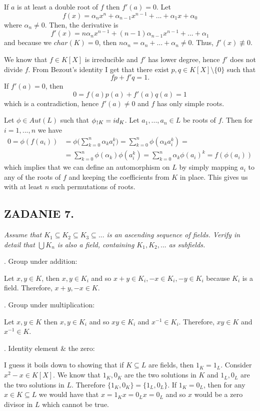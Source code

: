 \documentclass{article}
\begin{document}
If $a$ is at least a double root of $f$ then $f'(a)=0$. Let
$$f(x)=\alpha_nx^n+\alpha_{n-1}x^{n-1}+...+\alpha_1x+\alpha_0$$
where $\alpha_n\neq 0$. Then, the derivative is
$$f'(x)=n\alpha_nx^{n-1}+(n-1)\alpha_{n-1}x^{n-1}+...+\alpha_1$$
and because we $char(K)=0$, then $n\alpha_n=\alpha_n+...+\alpha_n\neq 0$. Thus, $f'(x)\not\equiv 0$.

We know that $f\in K[X]$ is irreducible and $f'$ has lower degree, hence $f'$ does not divide $f$. From Bezout's identity I get that there exist $p, q\in K[X]\setminus\{0\}$ such that
$$fp+f'q=1.$$
If $f'(a)=0$, then
$$0=f(a)p(a)+f'(a)q(a)=1$$
which is a contradiction, hence $f'(a)\neq 0$ and $f$ has only simple roots.

Let $\phi\in Aut(L)$ such that $\phi_{\upharpoonright K}=id_K$. Let $a_1,...,a_n\in L$ be roots of $f$. Then for $i=1,...,n$ we have
\begin{align*}
    0=\phi(f(a_i))&=\phi\Big(\sum\limits_{k=0}^n\alpha_ka_i^k\Big)=\sum\limits_{k=0}^n\phi(\alpha_ka^k_i)=\\
    &=\sum\limits_{k=0}^n\phi(\alpha_k)\phi(a_i^k)=\sum\limits_{k=0}^n\alpha_k\phi(a_i)^k=f(\phi(a_i))
\end{align*}
which implies that we can define an automorphism on $L$ by simply mapping $a_i$ to any of the roots of $f$ and keeping the coefficients from $K$ in place. This gives us with at least $n$ such permutations of roots.

\subsection*{ZADANIE 7.}
\emph{\color{pink}Assume that $K_1\subseteq K_2\subseteq K_3\subseteq...$ is an ascending sequence of fields. Verify in detail that $\bigcup K_n$ is also a field, containing $K_1,K_2,...$ as subfields.}
\smallskip

. Group under addition:

Let $x, y\in K$, then $x,y\in K_i$ and so $x+y\in K_i,-x\in K_i, -y\in K_i$ because $K_i$ is a field. Therefore, $x+y,-x\in K$.

. Group under multiplication:

Let $x,y\in K$ then $x,y\in K_i$ and so $xy\in K_i$ and $x^{-1}\in K_i$. Therefore, $xy\in K$ and $x^{-1}\in K$.

. Identity element \& the zero:

I guess it boils down to showing that if $K\subseteq L$ are fields, then $1_K=1_L$. Consider $x^2-x\in K[X]$. We know that $1_K, 0_K$ are the two solutions in $K$ and $1_L, 0_L$ are the two solutions in $L$. Therefore $\{1_K,0_K\}=\{1_L, 0_L\}$. If $1_K=0_L$, then for any $x\in K\subseteq L$ we would have that $x=1_Kx=0_Lx=0_L$ and so $x$ would be a zero divisor in $L$ which cannot be true.
\end{document}
